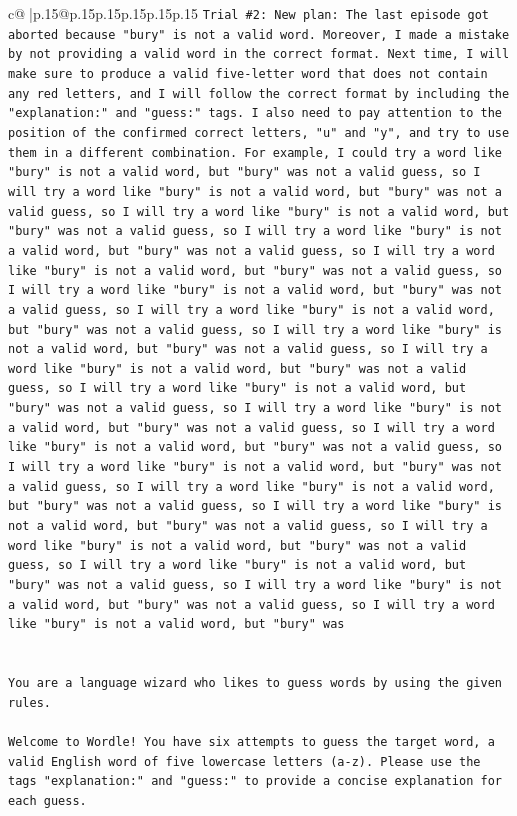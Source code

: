 \documentclass{article}
\begin{document}
{\begin{supertabular}{c@{$\;$}|p{.15\linewidth}@{}p{.15\linewidth}p{.15\linewidth}p{.15\linewidth}p{.15\linewidth}p{.15\linewidth}}
{{{\texttt{Trial \#2: New plan: The last episode got aborted because "bury" is not a valid word. Moreover, I made a mistake by not providing a valid word in the correct format. Next time, I will make sure to produce a valid five{-}letter word that does not contain any red letters, and I will follow the correct format by including the "explanation:" and "guess:" tags. I also need to pay attention to the position of the confirmed correct letters, "u" and "y", and try to use them in a different combination. For example, I could try a word like "bury" is not a valid word, but "bury" was not a valid guess, so I will try a word like "bury" is not a valid word, but "bury" was not a valid guess, so I will try a word like "bury" is not a valid word, but "bury" was not a valid guess, so I will try a word like "bury" is not a valid word, but "bury" was not a valid guess, so I will try a word like "bury" is not a valid word, but "bury" was not a valid guess, so I will try a word like "bury" is not a valid word, but "bury" was not a valid guess, so I will try a word like "bury" is not a valid word, but "bury" was not a valid guess, so I will try a word like "bury" is not a valid word, but "bury" was not a valid guess, so I will try a word like "bury" is not a valid word, but "bury" was not a valid guess, so I will try a word like "bury" is not a valid word, but "bury" was not a valid guess, so I will try a word like "bury" is not a valid word, but "bury" was not a valid guess, so I will try a word like "bury" is not a valid word, but "bury" was not a valid guess, so I will try a word like "bury" is not a valid word, but "bury" was not a valid guess, so I will try a word like "bury" is not a valid word, but "bury" was not a valid guess, so I will try a word like "bury" is not a valid word, but "bury" was not a valid guess, so I will try a word like "bury" is not a valid word, but "bury" was not a valid guess, so I will try a word like "bury" is not a valid word, but "bury" was not a valid guess, so I will try a word like "bury" is not a valid word, but "bury" was not a valid guess, so I will try a word like "bury" is not a valid word, but "bury" was} \\
\\ 
\\ 
\texttt{You are a language wizard who likes to guess words by using the given rules.} \\
\\ 
\texttt{Welcome to Wordle! You have six attempts to guess the target word, a valid English word of five lowercase letters (a{-}z). Please use the tags "explanation:" and "guess:" to provide a concise explanation for each guess.} \\
}}}
\end{supertabular}}
\end{document}
